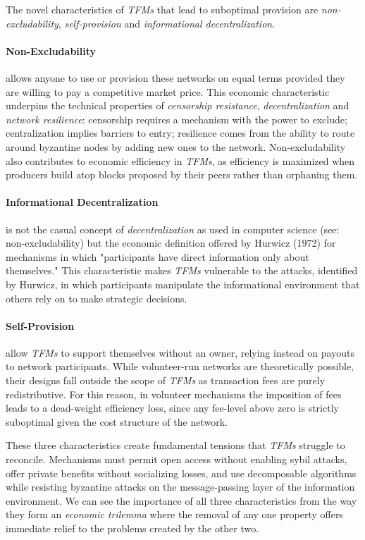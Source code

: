 
The novel characteristics of \textit{TFMs} that lead to suboptimal provision are \emph{non-excludability}, \emph{self-provision} and \emph{informational decentralization}. 

\paragraph{Non-Excludability} allows anyone to use or provision these networks on equal terms provided they are willing to pay a competitive market price. This economic characteristic underpins the technical properties of \textit{censorship resistance}, \textit{decentralization} and \textit{network resilience}: censorship requires a mechanism with the power to exclude; centralization implies barriers to entry; resilience comes from the ability to route around byzantine nodes by adding new ones to the network. Non-excludability also contributes to economic efficiency in \textit{TFMs}, as efficiency is maximized when producers build atop blocks proposed by their peers rather than orphaning them.

\paragraph{Informational Decentralization} is not the casual concept of \textit{decentralization} as used in computer science (see: non-excludability) but the economic definition offered by Hurwicz (1972) for mechanisms in which "participants have direct information only about themselves." This characteristic makes \textit{TFMs} vulnerable to the attacks, identified by Hurwicz, in which participants manipulate the informational environment that others rely on to make strategic decisions.

\paragraph{Self-Provision} allow \textit{TFMs} to support themselves without an owner, relying instead on payouts to network participants. While volunteer-run networks are theoretically possible, their designs fall outside the scope of \textit{TFMs} as transaction fees are purely redistributive. For this reason, in volunteer mechanisms the imposition of fees leads to a dead-weight efficiency loss, since any fee-level above zero is strictly suboptimal given the cost structure of the network.

These three characteristics create fundamental tensions that \textit{TFMs} struggle to reconcile. Mechanisms must permit open access without enabling sybil attacks, offer private benefits without socializing losses, and use decomposable algorithms while resisting byzantine attacks on the message-passing layer of the information environment. We can see the importance of all three characteristics from the way they form an \emph{economic trilemma} where the removal of any one property offers immediate relief to the problems created by the other two.

